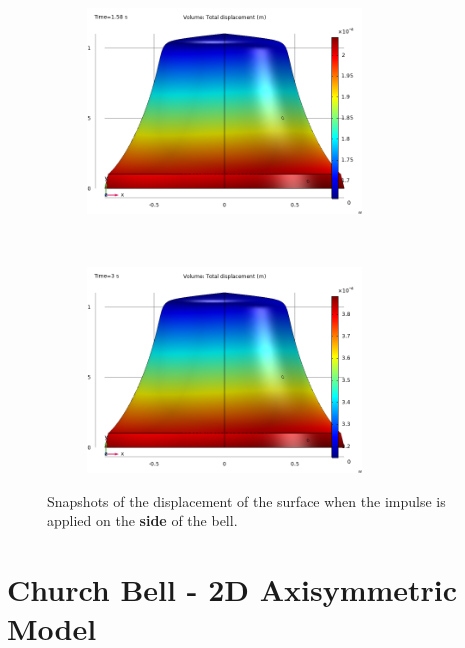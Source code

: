 \documentclass[a4paper]{article}
\begin{document}
\begin{figure}[h!]
	\begin{subfigure}{0.47\textwidth}
		\includegraphics[width=0.8\textwidth]{time domain study side/middle time.png}
	\end{subfigure}
	~
	\begin{subfigure}{0.47\textwidth}
		\includegraphics[width=0.8\textwidth]{time domain study side/final time.png}
	\end{subfigure}
	\caption{Snapshots of the displacement of the surface when the impulse is applied on the \textbf{side} of the bell.}
	\label{fig:timeSide}
\end{figure}

\section{Church Bell - 2D Axisymmetric Model}
\end{document}
